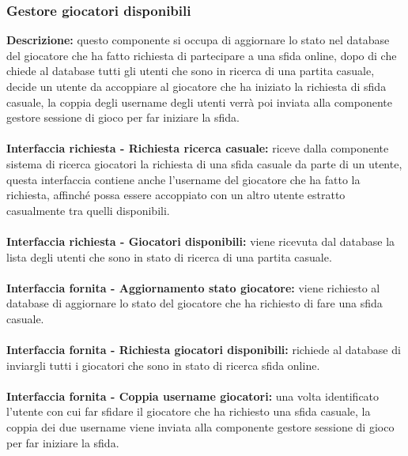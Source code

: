 \subsubsection{Gestore giocatori disponibili}
\textbf{Descrizione: }questo componente si occupa di aggiornare lo stato nel database del giocatore che ha fatto richiesta di partecipare a una sfida online, dopo di che chiede al database tutti gli utenti che sono in ricerca di una partita casuale, decide un utente da accoppiare al giocatore che ha iniziato la richiesta di sfida casuale, la coppia degli username degli utenti verrà poi inviata alla componente gestore sessione di gioco per far iniziare la sfida.\\
\\
\textbf{Interfaccia richiesta - Richiesta ricerca casuale: }riceve dalla componente sistema di ricerca giocatori la richiesta di una sfida casuale da parte di un utente, questa interfaccia contiene anche l'username del giocatore che ha fatto la richiesta, affinché possa essere accoppiato con un altro utente estratto casualmente tra quelli disponibili.\\
\\
\textbf{Interfaccia richiesta - Giocatori disponibili: }viene ricevuta dal database la lista degli utenti che sono in stato di ricerca di una partita casuale.\\
\\
\textbf{Interfaccia fornita  - Aggiornamento stato giocatore: }viene richiesto al database di aggiornare lo stato del giocatore che ha richiesto di fare una sfida casuale.\\
\\
\textbf{Interfaccia fornita - Richiesta giocatori disponibili: }richiede al database di inviargli tutti i giocatori che sono in stato di ricerca sfida online.\\
\\
\textbf{Interfaccia fornita - Coppia username giocatori: }una volta identificato l'utente con cui far sfidare il giocatore che ha richiesto una sfida casuale, la coppia dei due username viene inviata alla componente gestore sessione di gioco per far iniziare la sfida.\\

